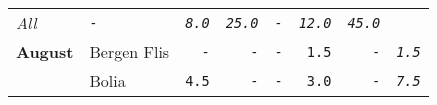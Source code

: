 \documentclass[11pt,A4paper,]{article}
\begin{document}
\begin{longtable}[]{@{}llrrrrrr@{}}
\begin{minipage}[t]{0.12\columnwidth}
\emph{All}\strut
\end{minipage} & \begin{minipage}[t]{0.12\columnwidth}\raggedleft\strut
\emph{\texttt{-}}\strut
\end{minipage} & \begin{minipage}[t]{0.12\columnwidth}\raggedleft\strut
\emph{\texttt{8.0}}\strut
\end{minipage} & \begin{minipage}[t]{0.12\columnwidth}\raggedleft\strut
\emph{\texttt{25.0}}\strut
\end{minipage} & \begin{minipage}[t]{0.12\columnwidth}\raggedleft\strut
\emph{\texttt{-}}\strut
\end{minipage} & \begin{minipage}[t]{0.12\columnwidth}\raggedleft\strut
\emph{\texttt{12.0}}\strut
\end{minipage} & \begin{minipage}[t]{0.12\columnwidth}\raggedleft\strut
\emph{\texttt{45.0}}\strut
\end{minipage}\tabularnewline
\textbf{August} & Bergen Flis & \texttt{-} & \texttt{-} & \texttt{-} &
\texttt{1.5} & \texttt{-} & \emph{\texttt{1.5}}\tabularnewline
\begin{minipage}[t]{0.12\columnwidth}\raggedright\strut
\strut
\end{minipage} & \begin{minipage}[t]{0.12\columnwidth}\raggedright\strut
Bolia\strut
\end{minipage} & \begin{minipage}[t]{0.12\columnwidth}\raggedleft\strut
\texttt{4.5}\strut
\end{minipage} & \begin{minipage}[t]{0.12\columnwidth}\raggedleft\strut
\texttt{-}\strut
\end{minipage} & \begin{minipage}[t]{0.12\columnwidth}\raggedleft\strut
\texttt{-}\strut
\end{minipage} & \begin{minipage}[t]{0.12\columnwidth}\raggedleft\strut
\texttt{3.0}\strut
\end{minipage} & \begin{minipage}[t]{0.12\columnwidth}\raggedleft\strut
\texttt{-}\strut
\end{minipage} & \begin{minipage}[t]{0.12\columnwidth}\raggedleft\strut
\emph{\texttt{7.5}}\strut
\end{minipage}\tabularnewline

\end{longtable}
\end{document}
